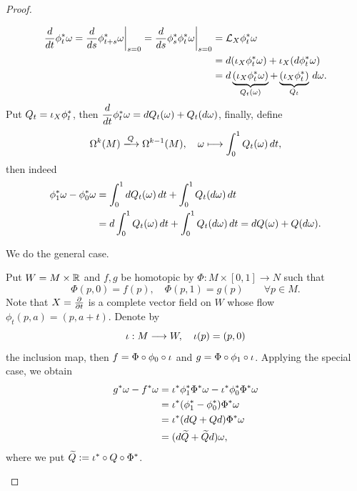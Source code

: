 \begin{proof}
\begin{roof}
\begin{roof}
\begin{align*}
                \frac{d}{dt} \phi_t^*\omega
                = \frac{d}{ds} \phi_{t+s}^*\omega \bigg|_{s=0}
                = \frac{d}{ds} \phi_s^*\phi_t^*\omega \bigg|_{s=0}
                &= \mathcal{L}_X \phi_t^*\omega \\
                &= d(\iota_X\phi_t^*\omega) + \iota_X(d\phi_t^*\omega) \\
                &= d\underbrace{(\iota_X\phi_t^*\omega)}_{Q_t(\omega)} + \underbrace{(\iota_X\phi_t^*)}_{Q_t}\,d\omega.
            \end{align*}
            Put \(Q_t = \iota_X\phi_t^*\), then \(\dfrac{d}{dt}\phi_t^*\omega = dQ_t(\omega) + Q_t(d\omega)\), finally, define \[
                \Omg^k(M) \xlongrightarrow{Q} \Omg^{k-1}(M),\quad \omg\longmapsto \int_0^1 Q_t(\omg)\,dt,
            \] then indeed \begin{align*}
                \phi_1^*\omega - \phi_0^*\omega
                &= \int_0^1 dQ_t(\omega)\,dt + \int_0^1 Q_t(d\omega)\,dt \\
                &= d\int_0^1 Q_t(\omega)\,dt + \int_0^1 Q_t(d\omega)\,dt
                = dQ(\omega) + Q(d\omega).
            \end{align*}
        \end{roof}
    \end{roof}
    We do the general case.
    \begin{roof}
        Put \(W = M\times\mathbb{R}\) and \(f,g\) be homotopic by \(\Phi:M\times[0,1]\longrightarrow N\) such that \[
            \Phi(p,0) = f(p),\quad \Phi(p,1) = g(p)\qquad \forall p\in M.
        \]
        Note that \(X = \frac{\partial}{\partial t}\) is a complete vector field on \(W\) whose flow \(\phi_t(p,a) = (p, a + t)\). Denote by \[
            \iota:M\longrightarrow W,\quad \iota(p) = (p,0)
        \] the inclusion map, then \(f = \Phi\circ\phi_0\circ\iota\) and \(g = \Phi\circ\phi_1\circ\iota\). Applying the special case, we obtain \begin{align*}
            g^*\omega - f^*\omega
            &= \iota^*\phi_1^*\Phi^*\omega - \iota^*\phi_0^*\Phi^*\omega \\
            &= \iota^*(\phi_1^* - \phi_0^*)\Phi^*\omega \\
            &= \iota^*(dQ + Qd)\Phi^*\omega \\
            &= (d\widetilde{Q} + \widetilde{Q}d)\omega,
        \end{align*} where we put \(\widetilde{Q} := \iota^*\circ Q\circ\Phi^*\).
    \end{roof}
\end{proof}

